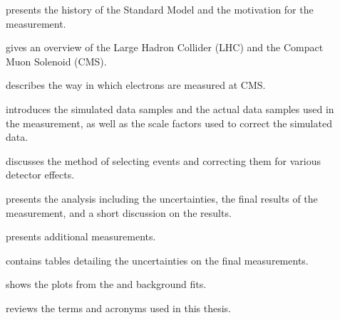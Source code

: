 \begin{description}

    \item[] presents the history of the Standard Model and
        the motivation for the measurement.

    \item[] gives an overview of the Large Hadron
        Collider (LHC) and the Compact Muon Solenoid (CMS).

    \item[] describes the way in which electrons
        are measured at CMS.

    \item[] introduces the simulated data
        samples and the actual data samples used in the measurement, as well as
        the scale factors used to correct the simulated data.

    \item[] discusses the method of selecting
        events and correcting them for various detector effects.

    \item[] presents the analysis including the
        uncertainties, the final results of the measurement, and a short
        discussion on the results.

    \item[] presents additional measurements.

    \item[] contains tables detailing the
        uncertainties on the final measurements.

    \item[] shows the plots from the \QCDjets and \wjets
        background fits.

    \item[] reviews the terms and acronyms used in this
        thesis.

\end{description}
